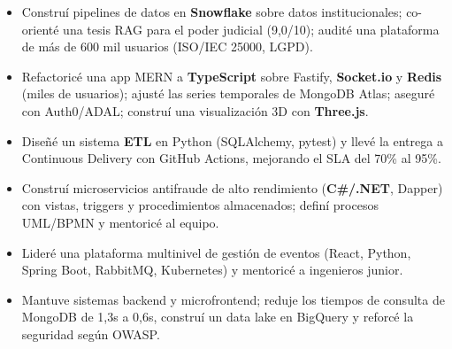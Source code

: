 \documentclass[10pt,a4paper]{altacv}
\begin{document}
\begin{itemize}
\item Construí pipelines de datos en \textbf{Snowflake} sobre datos institucionales; co-orienté una tesis RAG para el poder judicial (9,0/10); audité una plataforma de más de 600 mil usuarios (ISO/IEC 25000, LGPD).
\end{itemize}
\divider

\begin{itemize}
\item Refactoricé una app MERN a \textbf{TypeScript} sobre Fastify, \textbf{Socket.io} y \textbf{Redis} (miles de usuarios); ajusté las series temporales de MongoDB Atlas; aseguré con Auth0/ADAL; construí una visualización 3D con \textbf{Three.js}.
\end{itemize}
\divider

\begin{itemize}
\item Diseñé un sistema \textbf{ETL} en Python (SQLAlchemy, pytest) y llevé la entrega a Continuous Delivery con GitHub Actions, mejorando el SLA del 70\% al 95\%.
\end{itemize}
\divider

\begin{itemize}
\item Construí microservicios antifraude de alto rendimiento (\textbf{C\#/.NET}, Dapper) con vistas, triggers y procedimientos almacenados; definí procesos UML/BPMN y mentoricé al equipo.
\end{itemize}
\divider

\begin{itemize}
\item Lideré una plataforma multinivel de gestión de eventos (React, Python, Spring Boot, RabbitMQ, Kubernetes) y mentoricé a ingenieros junior.
\end{itemize}
\divider

\begin{itemize}
\item Mantuve sistemas backend y microfrontend; reduje los tiempos de consulta de MongoDB de 1,3s a 0,6s, construí un data lake en BigQuery y reforcé la seguridad según OWASP.
\end{itemize}
\divider
\end{document}
